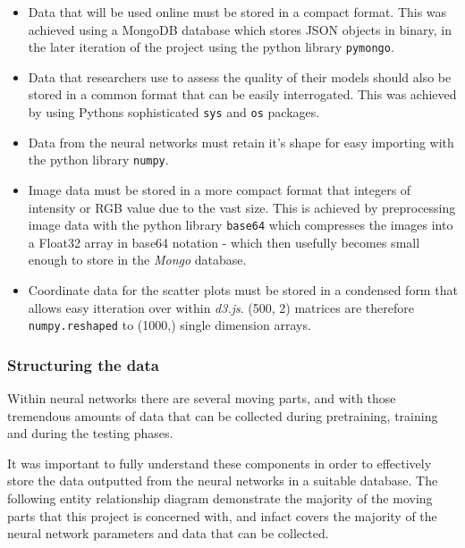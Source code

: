 \documentclass[a4paper,11pt,titlepage]{article}
\begin{document}
	\begin{itemize}
		\item Data that will be used online must be stored in a compact format. This was achieved using a MongoDB database which stores JSON objects in binary, in the later iteration of the project using the python library \texttt{pymongo}.
		\item Data that researchers use to assess the quality of their models should also be stored in a common format that can be easily interrogated. This was achieved by using Pythons sophisticated \texttt{sys} and \texttt{os} packages.
		\item Data from the neural networks must retain it's shape for easy importing with the python library \texttt{numpy}.
		\item Image data must be stored in a more compact format that integers of intensity or RGB value due to the vast size. This is achieved by preprocessing image data with the python library \texttt{base64} which compresses the images into a Float32 array in base64 notation - which then usefully becomes small enough to store in the \textit{Mongo} database.
		\item Coordinate data for the scatter plots must be stored in a condensed form that allows easy itteration over within \textit{d3.js}. (500, 2) matrices are therefore \texttt{numpy.reshaped} to (1000,) single dimension arrays.
	\end{itemize}
	
	\subsubsection{Structuring the data}
	Within neural networks there are several moving parts, and with those tremendous amounts of data that can be collected during pretraining, training and during the testing phases. 
	\par 
	It was important to fully understand these components in order to effectively store the data outputted from the neural networks in a suitable database. The following entity relationship diagram demonstrate the majority of the moving parts that this project is concerned with, and infact covers the majority of the neural network parameters and data that can be collected. 
		
\end{document}
